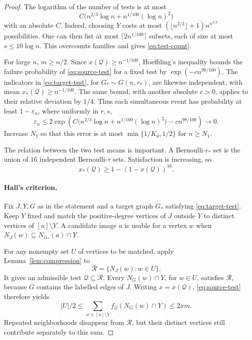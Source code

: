 \documentclass[11pt]{article}
\theoremstyle{remark}
\numberwithin{equation}{section}
\newcommand{\calQ}{\mathcal Q}
\newcommand{\calR}{\mathcal R}
\begin{document}
\begin{proof}
The logarithm of the number of tests is at most
\begin{equation}\label{eq:test-count}
 C\bigl(n^{2/3}\log n+n^{1/100}(\log n)^2\bigr)
\end{equation}
with an absolute $C$. Indeed, choosing $Y$ costs at most
$(\lfloor n^{2/3}\rfloor+1)n^{n^{2/3}}$ possibilities.
One can then list at most $\lceil2n^{1/100}\rceil$ subsets,
each of size at most $s\leq10\log n$. This overcounts families
and gives \eqref{eq:test-count}.

For large $n$, $m\geq n/2$. Since $x(\calQ)\geq n^{-1/100}$,
Hoeffding's inequality \cite{Hoeffding63} bounds the failure
probability of \eqref{eq:source-test} for a fixed test by
$\exp(-c n^{98/100})$. The indicators in
\eqref{eq:target-test}, for $G_*\sim G(n,r_*)$, are likewise
independent, with mean $x_*(\calQ)\geq n^{-1/100}$.
The same bound, with another absolute $c>0$, applies to their
relative deviation by $1/4$.
Thus each simultaneous event has probability at least
$1-\varepsilon_n$, where uniformly in $r,s$,
\begin{equation}\label{eq:uniform-error}
 \varepsilon_n\leq
 2\exp\!\left(
 C\bigl(n^{2/3}\log n+n^{1/100}(\log n)^2\bigr)
 -c n^{98/100}\right)\longrightarrow0.
\end{equation}
Increase $N_1$ so that this error is at most
$\min\{1/K_0,1/2\}$ for $n\geq N_1$.

The relation between the two test means is important. A
Bernoulli-$r_*$ set is the union of $16$ independent
Bernoulli-$\tau$ sets. Satisfaction is increasing, so
\begin{equation}\label{eq:amplification}
 x_*(\calQ)\geq1-(1-x(\calQ))^{16}.
\end{equation}

\paragraph{Hall's criterion.}
Fix $J,Y,G$ as in the statement and a target graph $G_*$
satisfying \eqref{eq:target-test}. Keep $Y$ fixed and match
the positive-degree vertices of $J$ outside $Y$ to distinct
vertices of $[n]\setminus Y$. A candidate image $a$ is usable
for a vertex $w$ when
$N_J(w)\subseteq N_{G_*}(a)\cap Y$.

For any nonempty set $U$ of vertices to be matched, apply
Lemma~\ref{lem:compression} to
\[
 \calR=\{N_J(w):w\in U\}.
\]
It gives an admissible test $\calQ\subseteq\calR$.
Every $N_G(w)\cap Y$, for $w\in U$, satisfies $\calR$,
because $G$ contains the labelled edges of $J$. Writing
$x=x(\calQ)$, \eqref{eq:source-test} therefore yields
\begin{equation}\label{eq:hall-source}
 |U|/2\leq\sum_{w\in[n]\setminus Y}
       f_{\calQ}(N_G(w)\cap Y)\leq2xm.
\end{equation}
Repeated neighborhoods disappear from $\calR$, but their
distinct vertices still contribute separately to this sum.


\end{proof}
\end{document}
